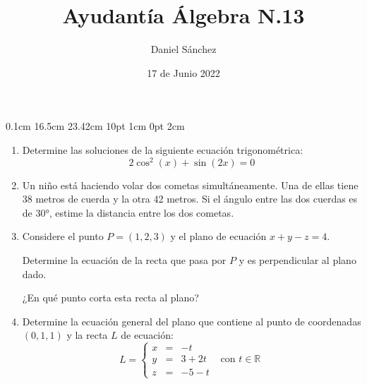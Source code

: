\documentclass[12pt]{article}
\begin{document}
\setmargins{2.5cm}
{0.1cm}
{16.5cm}
{23.42cm}
{10pt}
{1cm}
{0pt}
{2cm}

\title{Ayudant\'ia \'Algebra N.13}
\date{17 de Junio 2022}
\author{Daniel S\'anchez}
\maketitle

\begin{enumerate}
      \item Determine las soluciones de la siguiente ecuaci\'on trigonom\'etrica:
            $$2\cos^2(x)+\sin(2x)=0$$
      \item Un ni\~no est\'a haciendo volar dos cometas simult\'aneamente. Una de ellas tiene 38
            metros de cuerda y la otra 42 metros. Si el \'angulo entre las dos cuerdas es de 30°,
            estime la distancia entre los dos cometas.
      \item Considere el punto $P=(1,2,3)$ y el plano de ecuaci\'on $x+y-z=4$.
            
            Determine la ecuaci\'on de la recta que pasa por $P$ y es perpendicular al plano dado.
            
            ¿En qu\'e punto corta esta recta al plano?
      \item Determine la ecuaci\'on general del plano que contiene al punto de coordenadas $(0,1,1)$
            y la recta $L$ de ecuaci\'on:
            $$L=\left\{ \begin{array}{cccl}
                        x & = & -t                                    \\
                        y & = & 3+2t & \mbox{ con $t \in \mathbb{R}$} \\
                        z & = & -5-t
                  \end{array}\right.$$
\end{enumerate}
\end{document}
